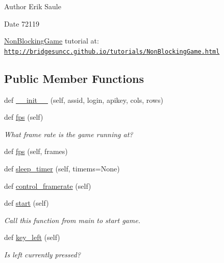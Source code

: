 \begin{DoxyAuthor}{Author}
Erik Saule 
\end{DoxyAuthor}
\begin{DoxyDate}{Date}
72119
\end{DoxyDate}
\mbox{\hyperlink{classbridges_1_1non__blocking__game_1_1_non_blocking_game}{Non\+Blocking\+Game}} tutorial at\+: \href{http://bridgesuncc.github.io/tutorials/NonBlockingGame.html}{\tt http\+://bridgesuncc.\+github.\+io/tutorials/\+Non\+Blocking\+Game.\+html} \subsection*{Public Member Functions}
\begin{DoxyCompactItemize}
\item 
def \mbox{\hyperlink{classbridges_1_1non__blocking__game_1_1_non_blocking_game_a19362773d256eec033f04cfd00b7160c}{\+\_\+\+\_\+init\+\_\+\+\_\+}} (self, assid, login, apikey, cols, rows)
\item 
def \mbox{\hyperlink{classbridges_1_1non__blocking__game_1_1_non_blocking_game_a5763c5a20f130943cec948a9f42803a0}{fps}} (self)
\begin{DoxyCompactList}\small\item\em What frame rate is the game running at? \end{DoxyCompactList}\item 
def \mbox{\hyperlink{classbridges_1_1non__blocking__game_1_1_non_blocking_game_a46b4b4a25c7c7ffc78126a7b693b7ceb}{fps}} (self, frames)
\item 
def \mbox{\hyperlink{classbridges_1_1non__blocking__game_1_1_non_blocking_game_a2e4dca6a290c65472200e69012e01d16}{sleep\+\_\+timer}} (self, timems=None)
\item 
def \mbox{\hyperlink{classbridges_1_1non__blocking__game_1_1_non_blocking_game_ad751eeccbf14adc09f9c11acce3757c9}{control\+\_\+framerate}} (self)
\item 
def \mbox{\hyperlink{classbridges_1_1non__blocking__game_1_1_non_blocking_game_ad6e23c265e1b710114459f0b666d25cb}{start}} (self)
\begin{DoxyCompactList}\small\item\em Call this function from main to start game. \end{DoxyCompactList}\item 
def \mbox{\hyperlink{classbridges_1_1non__blocking__game_1_1_non_blocking_game_a87490ef28d161f22e753aab5d3e67e46}{key\+\_\+left}} (self)
\begin{DoxyCompactList}\small\item\em Is left currently pressed? \end{DoxyCompactList}\item 

\end{DoxyCompactItemize}

